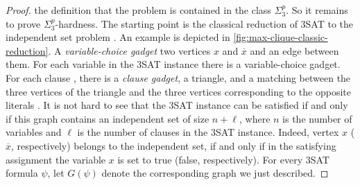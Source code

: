 \begin{proof}
 the definition that the problem is contained in the class $\Sigma_3^p$. So it remains to prove $\Sigma_3^p$-hardness. The starting point is the classical reduction of 3SAT to the independent set problem \cite{garey1979computers}. An example is depicted in \cref{fig:max-clique-classic-reduction}. A \emph{variable-choice gadget}  two vertices $x$ and $\overline x$ and an edge between them. For each variable in the 3SAT instance there is a variable-choice gadget. For each clause , there is a \emph{clause gadget},  a triangle, and a matching between the three vertices of the triangle and the three vertices corresponding to the opposite literals . It is not hard to see that the 3SAT instance can be satisfied if and only if this graph contains an independent set of size $n+\ell$, where $n$ is the number of variables and $\ell$ is the number of clauses in the 3SAT instance. Indeed, vertex $x$ ($\overline x$, respectively) belongs to the independent set, if and only if in the satisfying assignment the variable $x$ is set to true (false, respectively). For every 3SAT formula $\psi$, let $G(\psi)$ denote the corresponding graph we just described.


\end{proof}

